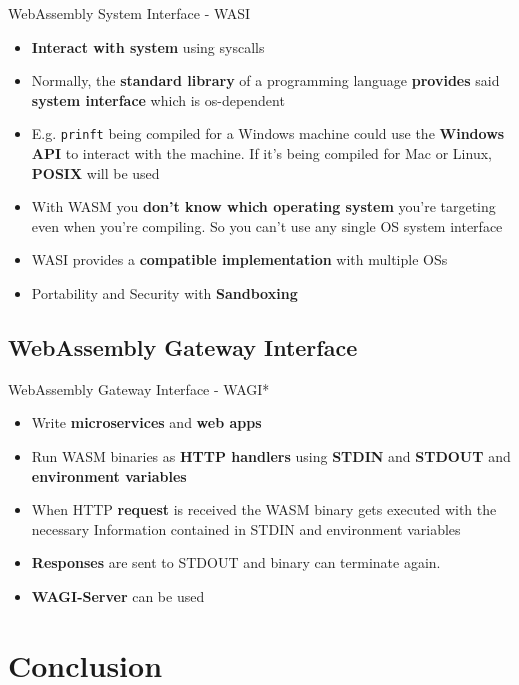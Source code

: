 \documentclass{beamer}
\begin{document}
\begin{frame}{WebAssembly System Interface - WASI}
\begin{itemize} 
    \item \textbf{Interact with system} using syscalls
    \item Normally, the \textbf{standard library} of a programming language \textbf{provides} said \textbf{system interface} which is os-dependent
    \item E.g. \lstinline{prinft} being compiled for a Windows machine could use the \textbf{Windows API} to interact with the machine. If it's being compiled for Mac or Linux, \textbf{POSIX} will be used
    \item With WASM you \textbf{don't know which operating system} you're targeting even when you're compiling. So you can't use any single OS system interface 
    \item WASI provides a \textbf{compatible implementation} with multiple OSs
    \item Portability and Security with \textbf{Sandboxing}
\end{itemize}
\end{frame}

\subsection{WebAssembly Gateway Interface}
\begin{frame}{WebAssembly Gateway Interface - WAGI*}
    \begin{itemize}
        \item Write \textbf{microservices} and \textbf{web apps}
        \item Run WASM binaries as \textbf{HTTP handlers} using \textbf{STDIN} and \textbf{STDOUT} and \textbf{environment variables}
        \item When HTTP \textbf{request} is received the WASM binary gets executed with the necessary Information contained in STDIN and environment variables
        \item \textbf{Responses} are sent to STDOUT and binary can terminate again.
        \item \textbf{WAGI-Server} can be used
    \end{itemize}
\end{frame}

\section{Conclusion}
\end{document}
